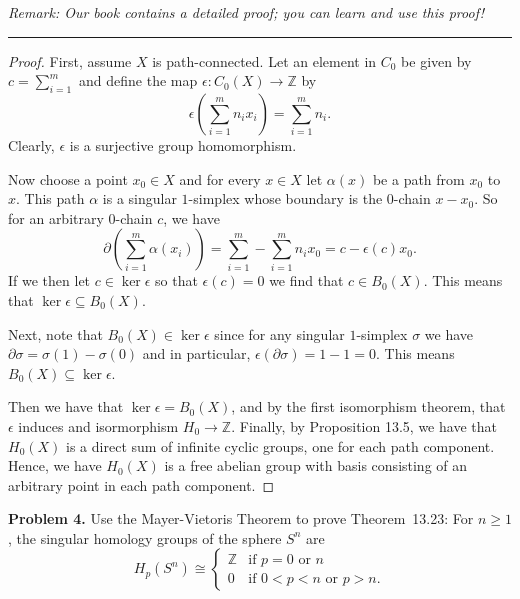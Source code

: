 \documentclass[leqno]{article}
\theoremstyle{nonumberplain}
\newtheorem{proof}{Proof}
\newcommand{\Z}{\ensuremath{\mathbb{Z}}}
\begin{document}
\emph{Remark: Our book contains a detailed proof; you can learn and use this proof!}

\noindent\rule[0.5ex]{\linewidth}{1pt}

\begin{proof}
First, assume $X$ is path-connected.  Let an element in $C_0$ be given by $c=\sum_{i=1}^m$ and define the map $\epsilon \colon C_0(X)\to \Z$ by
\[
\epsilon \left( \sum_{i=1}^m n_i x_i \right) = \sum_{i=1}^m n_i.
\]
Clearly, $\epsilon$ is a surjective group homomorphism.  

Now choose a point $x_0\in X$ and for every $x\in X$ let $\alpha(x)$ be a path from $x_0$ to $x$.  This path $\alpha$ is a singular $1$-simplex whose boundary is the $0$-chain $x-x_0$.  So for an arbitrary $0$-chain $c$, we have
\[
\partial \left( \sum_{i=1}^m \alpha(x_i) \right) = \sum_{i=1}^m - \sum_{i=1}^m n_i x_0=c-\epsilon(c)x_0.
\]
If we then let $c\in \ker\epsilon$ so that $\epsilon(c)=0$ we find that $c\in B_0(X)$. This means that $\ker\epsilon \subseteq B_0(X)$.

Next, note that $B_0(X)\in \ker \epsilon$ since for any singular $1$-simplex $\sigma$ we have $\partial \sigma = \sigma(1)-\sigma(0)$ and in particular, $\epsilon(\partial\sigma)=1-1=0$.  This means $B_0(X)\subseteq \ker \epsilon$.  

Then we have that $\ker\epsilon = B_0(X)$, and by the first isomorphism theorem, that $\epsilon$ induces and isormorphism $H_0\to \Z$.  Finally, by Proposition 13.5, we have that $H_0(X)$ is a direct sum of infinite cyclic groups, one for each path component.  Hence, we have $H_0(X)$ is a free abelian group with basis consisting of an arbitrary point in each path component. 
\end{proof}

\pagebreak





\noindent\textbf{Problem 4.}  Use the Mayer-Vietoris Theorem to prove Theorem~13.23: For $n\ge 1$, the singular homology groups of the sphere $S^n$ are
\[ H_p(S^n)\cong\begin{cases}
\Z &\mbox{if }p=0\mbox{ or }n\\
0 &\mbox{if }0<p<n\mbox{ or }p>n.
\end{cases} \]
\end{document}
